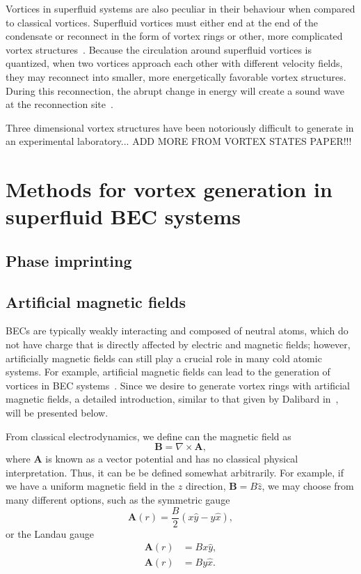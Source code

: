 Vortices in superfluid systems are also peculiar in their behaviour when compared to classical vortices.
Superfluid vortices must either end at the end of the condensate or reconnect in the form of vortex rings or other, more complicated vortex structures~\cite{Reichl2013}.
Because the circulation around superfluid vortices is quantized, when two vortices approach each other with different velocity fields, they may reconnect into smaller, more energetically favorable vortex structures.
During this reconnection, the abrupt change in energy will create a sound wave at the reconnection site~\cite{Feynman1955}.

Three dimensional vortex structures have been notoriously difficult to generate in an experimental laboratory... ADD MORE FROM VORTEX STATES PAPER!!!

\section{Methods for vortex generation in superfluid BEC systems}

\subsection{Phase imprinting}
\subsection{Artificial magnetic fields}
\label{sec:gauge}

BECs are typically weakly interacting and composed of neutral atoms, which do not have charge that is directly affected by electric and magnetic fields; however, artificially magnetic fields can still play a crucial role in many cold atomic systems.
For example, artificial magnetic fields can lead to the generation of vortices in BEC systems~\cite{Lin2009}.
Since we desire to generate vortex rings with artificial magnetic fields, a detailed introduction, similar to that given by Dalibard in~\cite{Dalibard2015}, will be presented below.

From classical electrodynamics, we define can the magnetic field as
\begin{equation}
\mathbf{B} = \nabla \times \mathbf{A},
\end{equation}
where $\mathbf{A}$ is known as a vector potential and has no classical physical interpretation.
Thus, it can be be defined somewhat arbitrarily.
For example, if we have a uniform magnetic field in the $\hat z$ direction, $\mathbf{B} = B \hat z$, we may choose from many different options, such as the symmetric gauge
\begin{equation}
\mathbf{A}(r) = \frac{B}{2}(x \hat y - y \hat x),
\end{equation}
or the Landau gauge
\begin{equation}
\begin{split}
\mathbf{A}(r) &= Bx \hat y, \\
\mathbf{A}(r) &= By \hat x.
\end{split}
\end{equation}

